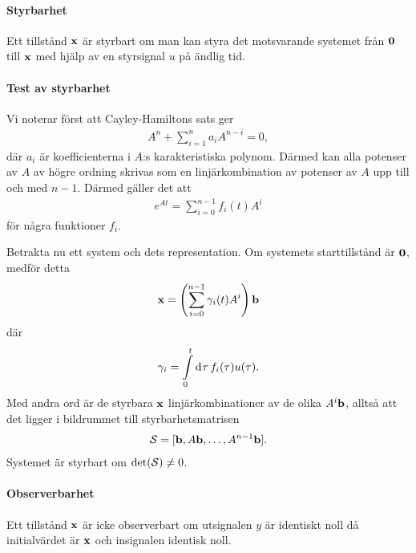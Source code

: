 \paragraph{Styrbarhet}
Ett tillstånd $\vb{x}$ är styrbart om man kan styra det motsvarande systemet från $\vb{0}$ till $\vb{x}$ med hjälp av en styrsignal $u$ på ändlig tid.

\paragraph{Test av styrbarhet}
Vi noterar först att Cayley-Hamiltons sats ger
\begin{align*}
	A^{n} + \sum\limits_{i = 1}^{n}a_{i}A^{n - i} = 0,
\end{align*}
där $a_{i}$ är koefficienterna i $A$:s karakteristiska polynom. Därmed kan alla potenser av $A$ av högre ordning skrivas som en linjärkombination av potenser av $A$ upp till och med $n - 1$. Därmed gäller det att
\begin{align*}
	e^{At} = \sum\limits_{i = 0}^{n - 1}f_{i}(t)A^{i}
\end{align*}
för några funktioner $f_{i}$.

Betrakta nu ett system och dets representation. Om systemets starttillstånd är $\vb{0}$, medför detta
\begin{align*}
	\vb{x} = \left(\sum\limits_{i = 0}^{n - 1}\gamma_{i}(t)A^{i}\right)\vb{b}
\end{align*}
där
\begin{align*}
	\gamma_{i} = \integ{0}{t}{\tau}{f_{i}(\tau)u(\tau)}.
\end{align*}
Med andra ord är de styrbara $\vb{x}$ linjärkombinationer av de olika $A^{i}\vb{b}$, alltså att det ligger i bildrummet till styrbarhetsmatrisen
\begin{align*}
	\S = [\vb{b}, A\vb{b}, \dots, A^{n - 1}\vb{b}].
\end{align*}
Systemet är styrbart om $\det(\S) \neq 0$.

\paragraph{Observerbarhet}
Ett tillstånd $\vb{x}$ är icke observerbart om utsignalen $y$ är identiskt noll då initialvärdet är $\vb{x}$ och insignalen identisk noll.

